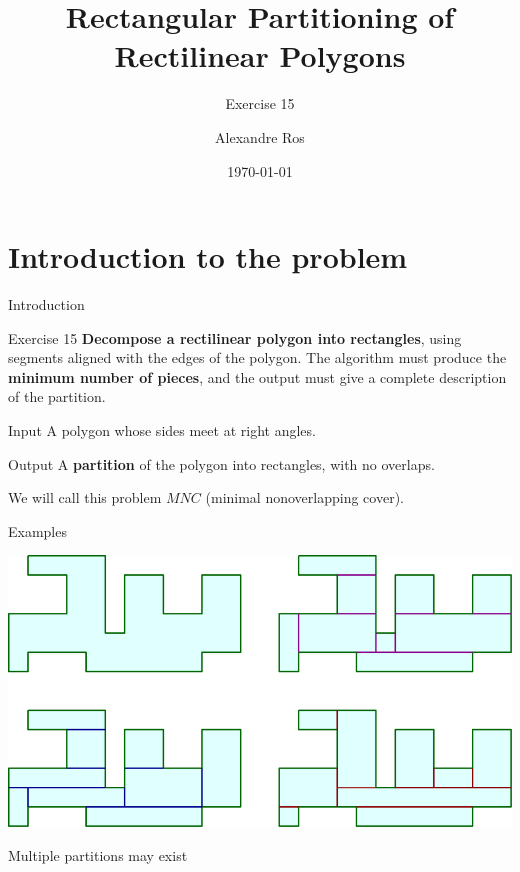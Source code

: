 \documentclass{beamer}
\title{Rectangular Partitioning of Rectilinear Polygons}
\subtitle{Exercise 15}
\author{Alexandre Ros}
\date{\today}
\begin{document}
\frame{\titlepage}


\section{Introduction to the problem}

\begin{frame}{Introduction}
	\begin{block}{Exercise 15}
	\textbf{Decompose a rectilinear polygon into rectangles}, using segments aligned with the edges of the polygon.
The algorithm must produce the \textbf{minimum number of pieces}, and the output must give a
complete description of the partition.
	\end{block}
	\begin{block}{Input}
	A polygon whose sides meet at right angles.
	\end{block}  
	\begin{block}{Output}
	A \textbf{partition} of the polygon into rectangles, with no overlaps.
	\end{block}
	
	We will call this problem $MNC$ (minimal nonoverlapping cover).
\end{frame}

\begin{frame}[t, shrink=10]{Examples}
\vspace{5px}

\centering
  \includegraphics[width=\textwidth]{"./rect1.png"}
  
  \vspace{15px}
	Multiple partitions may exist
\end{frame}
\end{document}

